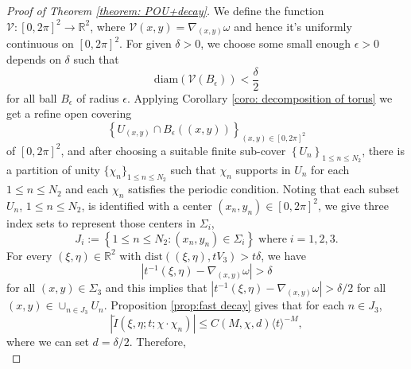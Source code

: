 \documentclass[12pt]{amsart}
\newcommand\JP[1]{\langle#1\rangle}
\newcommand{\R}{\mathbb{R}}
\begin{document}
\begin{proof}[Proof of Theorem \ref{theorem: POU+decay}]
    We define the function $\mathcal{V}:\left[0,2\pi\right]^{2}\to \R^{2}$, where $\mathcal{V}\left(x,y\right)=\nabla_{\left(x,y\right)}\omega$ and hence it's uniformly continuous on $\left[0,2\pi\right]^{2}$. For given $\delta>0$, we choose some small enough $\epsilon>0$ depends on $\delta$ such that
    \begin{equation*}
        \mathrm{diam}\left(\mathcal{V}\left(B_{\epsilon}\right)\right)<\frac{\delta}{2}
    \end{equation*}
    for all ball $B_{\epsilon}$ of radius $\epsilon$. Applying Corollary \ref{coro: decomposition of torus} we get a refine open covering \begin{equation*}
        \left\{U_{\left(x,y\right)}\cap B_{\epsilon}\left(\left(x,y\right)\right)\right\}_{\left(x,y\right)\in\left[0,2\pi\right]^{2}}
    \end{equation*} 
    of $\left[0,2\pi\right]^{2}$, and after choosing a suitable finite sub-cover $\left\{U_{n}\right\}_{1\leq n\leq N_{2}}$, there is a partition of unity $\{\chi_{n}\}_{1\leq n\leq N_{2}}$ such that $\chi_{n}$ supports in $U_{n}$ for each $1\leq n\leq N_{2}$ and each $\chi_{n}$ satisfies the periodic condition. Noting that each subset $U_{n}$, $1\leq n\leq N_{2}$, is identified with a center $\left(x_{n},y_{n}\right)\in\left[0,2\pi\right]^{2}$, we give three index sets to represent those centers in $\Sigma_{i}$,
    \begin{equation*}
        J_{i}:=\left\{1\leq n\leq N_{2}:\left(x_{n},y_{n}\right)\in\Sigma_{i}\right\}\;\mathrm{where}\;i=1,2,3.
    \end{equation*}
    For every $\left(\xi,\eta\right)\in \R^{2}$ with $\mathrm{dist}\left(\left(\xi,\eta\right),tV_{3}\right)>t\delta$, we have
    \begin{equation*}
        \left|t^{-1}\left(\xi,\eta\right)-\nabla_{\left(x,y\right)}\omega\right|>\delta
    \end{equation*}
    for all $\left(x,y\right)\in \Sigma_{3}$ and this implies that $\left|t^{-1}\left(\xi,\eta\right)-\nabla_{\left(x,y\right)}\omega\right|>\delta/2$ for all $\left(x,y\right)\in\cup_{n\in J_{3}}U_{n}$. Proposition \ref{prop:fast decay} gives that for each $n\in J_{3}$, 
    \begin{equation*}
        \left|\widetilde{I}\left(\xi,\eta;t;\chi\cdot\chi_{n}\right)\right|\leq C\left(M,\chi,d\right)\JP{t}^{-M},
    \end{equation*}
    where we can set $d=\delta/2$. Therefore, 
    \begin{equation*}

\end{equation*}
\end{proof}
\end{document}
